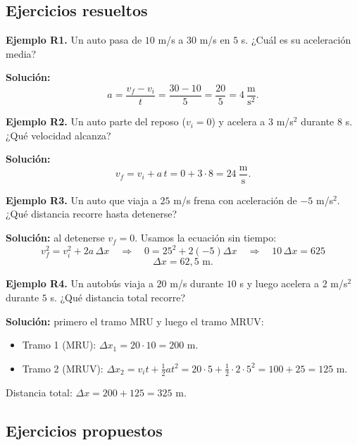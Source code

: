 \documentclass[12pt, letterpaper]{article}
\begin{document}
\subsection{Ejercicios resueltos}

\textbf{Ejemplo R1.} Un auto pasa de $10$ m/s a $30$ m/s en $5$ s. ¿Cuál es su aceleración media?

\begin{cuadrosolucion}
  \textbf{Solución:}
  $$a = \frac{v_f - v_i}{t} = \frac{30 - 10}{5} = \frac{20}{5} = 4 \ \frac{\text{m}}{\text{s}^2}.$$
\end{cuadrosolucion}

\textbf{Ejemplo R2.} Un auto parte del reposo ($v_i = 0$) y acelera a $3$ m/s$^2$ durante $8$ s. ¿Qué velocidad alcanza?

\begin{cuadrosolucion}
  \textbf{Solución:}
  $$v_f = v_i + a\, t = 0 + 3 \cdot 8 = 24 \ \frac{\text{m}}{\text{s}}.$$
\end{cuadrosolucion}

\textbf{Ejemplo R3.} Un auto que viaja a $25$ m/s frena con aceleración de $-5$ m/s$^2$. ¿Qué distancia recorre hasta detenerse?

\begin{cuadrosolucion}
  \textbf{Solución:} al detenerse $v_f = 0$. Usamos la ecuación sin tiempo:
  $$v_f^2 = v_i^2 + 2a\,\Delta x \quad \Rightarrow \quad 0 = 25^2 + 2(-5)\Delta x \quad \Rightarrow \quad 10\,\Delta x = 625$$
  $$\Delta x = 62{,}5 \text{ m}.$$
\end{cuadrosolucion}

\textbf{Ejemplo R4.} Un autobús viaja a $20$ m/s durante $10$ s y luego acelera a $2$ m/s$^2$ durante $5$ s. ¿Qué distancia total recorre?

\begin{cuadrosolucion}
  \textbf{Solución:} primero el tramo MRU y luego el tramo MRUV:
  \begin{itemize}
    \item Tramo 1 (MRU): $\Delta x_1 = 20 \cdot 10 = 200$ m.
    \item Tramo 2 (MRUV): $\Delta x_2 = v_i t + \tfrac{1}{2} a t^2 = 20 \cdot 5 + \tfrac{1}{2} \cdot 2 \cdot 5^2 = 100 + 25 = 125$ m.
  \end{itemize}
  Distancia total: $\Delta x = 200 + 125 = 325$ m.
\end{cuadrosolucion}

\subsection{Ejercicios propuestos}
\end{document}
